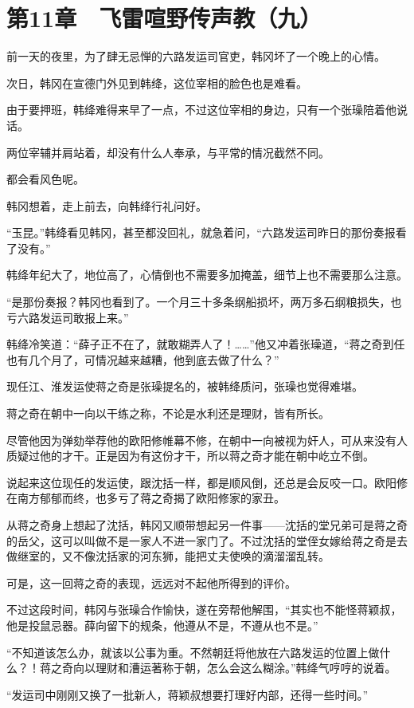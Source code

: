 \section{第11章　飞雷喧野传声教（九）}

前一天的夜里，为了肆无忌惮的六路发运司官吏，韩冈坏了一个晚上的心情。

次日，韩冈在宣德门外见到韩绛，这位宰相的脸色也是难看。

由于要押班，韩绛难得来早了一点，不过这位宰相的身边，只有一个张璪陪着他说话。

两位宰辅并肩站着，却没有什么人奉承，与平常的情况截然不同。

都会看风色呢。

韩冈想着，走上前去，向韩绛行礼问好。

“玉昆。”韩绛看见韩冈，甚至都没回礼，就急着问，“六路发运司昨日的那份奏报看了没有。”

韩绛年纪大了，地位高了，心情倒也不需要多加掩盖，细节上也不需要那么注意。

“是那份奏报？韩冈也看到了。一个月三十多条纲船损坏，两万多石纲粮损失，也亏六路发运司敢报上来。”

韩绛冷笑道：“薛子正不在了，就敢糊弄人了！……”他又冲着张璪道，“蒋之奇到任也有几个月了，可情况越来越糟，他到底去做了什么？”

现任江、淮发运使蒋之奇是张璪提名的，被韩绛质问，张璪也觉得难堪。

蒋之奇在朝中一向以干练之称，不论是水利还是理财，皆有所长。

尽管他因为弹劾举荐他的欧阳修帷幕不修，在朝中一向被视为奸人，可从来没有人质疑过他的才干。正是因为有这份才干，所以蒋之奇才能在朝中屹立不倒。

说起来这位现任的发运使，跟沈括一样，都是顺风倒，还总是会反咬一口。欧阳修在南方郁郁而终，也多亏了蒋之奇揭了欧阳修家的家丑。

从蒋之奇身上想起了沈括，韩冈又顺带想起另一件事——沈括的堂兄弟可是蒋之奇的岳父，这可以叫做不是一家人不进一家门了。不过沈括的堂侄女嫁给蒋之奇是去做继室的，又不像沈括家的河东狮，能把丈夫使唤的滴溜溜乱转。

可是，这一回蒋之奇的表现，远远对不起他所得到的评价。

不过这段时间，韩冈与张璪合作愉快，遂在旁帮他解围，“其实也不能怪蒋颖叔，他是投鼠忌器。薛向留下的规条，他遵从不是，不遵从也不是。”

“不知道该怎么办，就该以公事为重。不然朝廷将他放在六路发运的位置上做什么？！蒋之奇向以理财和漕运著称于朝，怎么会这么糊涂。”韩绛气哼哼的说着。

“发运司中刚刚又换了一批新人，蒋颖叔想要打理好内部，还得一些时间。”

